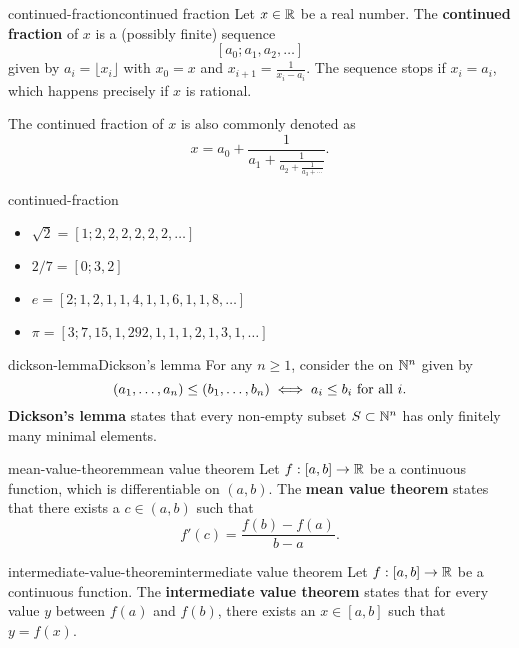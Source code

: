 \begin{topic}{continued-fraction}{continued fraction}
    Let $x \in \mathbb{R}$ be a real number. The \textbf{continued fraction} of $x$ is a (possibly finite) sequence
    \[ [a_0; a_1, a_2, \ldots] \]
    given by $a_i = \lfloor x_i \rfloor$ with $x_0 = x$ and $x_{i + 1} = \frac{1}{x_i - a_i}$. The sequence stops if $x_i = a_i$, which happens precisely if $x$ is rational.
    
    The continued fraction of $x$ is also commonly denoted as
    \[ x = a_0 + \frac{1}{a_1 + \frac{1}{a_2 + \frac{1}{a_3 + \cdots }}} . \]
\end{topic}

\begin{example}{continued-fraction}
    \begin{itemize}
        \item $\sqrt{2} = [1; 2, 2, 2, 2, 2, 2, \ldots]$
        \item $2/7 = [0; 3, 2]$
        \item $e = [2; 1, 2, 1, 1, 4, 1, 1, 6, 1, 1, 8, \ldots]$
        \item $\pi = [3; 7, 15, 1, 292, 1, 1, 1, 2, 1, 3, 1, \ldots]$
    \end{itemize}
\end{example}

\begin{topic}{dickson-lemma}{Dickson's lemma}
    For any $n \ge 1$, consider the  on $\mathbb{N}^n$ given by
    \[ (a_1, \ldots, a_n) \le (b_1, \ldots, b_n) \iff a_i \le b_i \textup{ for all } i . \]
    \textbf{Dickson's lemma} states that every non-empty subset $S \subset \mathbb{N}^n$ has only finitely many minimal elements.
\end{topic}

\begin{topic}{mean-value-theorem}{mean value theorem}
    Let $f : [a, b] \to \mathbb{R}$ be a continuous function, which is differentiable on $(a, b)$. The \textbf{mean value theorem} states that there exists a $c \in (a, b)$ such that
    \[ f'(c) = \frac{f(b) - f(a)}{b - a} . \]
\end{topic}

\begin{topic}{intermediate-value-theorem}{intermediate value theorem}
    Let $f : [a, b] \to \mathbb{R}$ be a continuous function. The \textbf{intermediate value theorem} states that for every value $y$ between $f(a)$ and $f(b)$, there exists an $x \in [a, b]$ such that $y = f(x)$.
\end{topic}

